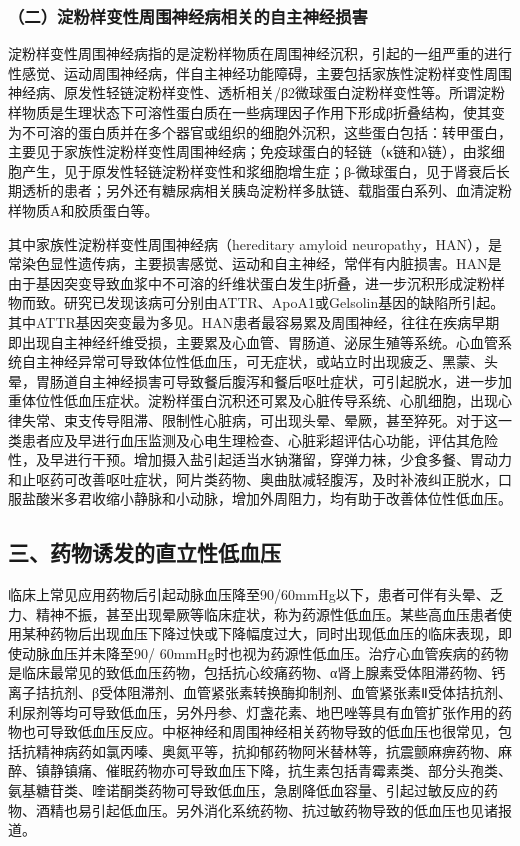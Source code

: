 \subsubsection{（二）淀粉样变性周围神经病相关的自主神经损害}

淀粉样变性周围神经病指的是淀粉样物质在周围神经沉积，引起的一组严重的进行性感觉、运动周围神经病，伴自主神经功能障碍，主要包括家族性淀粉样变性周围神经病、原发性轻链淀粉样变性、透析相关/β2微球蛋白淀粉样变性等。所谓淀粉样物质是生理状态下可溶性蛋白质在一些病理因子作用下形成β折叠结构，使其变为不可溶的蛋白质并在多个器官或组织的细胞外沉积，这些蛋白包括：转甲蛋白，主要见于家族性淀粉样变性周围神经病；免疫球蛋白的轻链（κ链和λ链），由浆细胞产生，见于原发性轻链淀粉样变性和浆细胞增生症；β-微球蛋白，见于肾衰后长期透析的患者；另外还有糖尿病相关胰岛淀粉样多肽链、载脂蛋白系列、血清淀粉样物质A和胶质蛋白等。

其中家族性淀粉样变性周围神经病（hereditary amyloid
neuropathy，HAN），是常染色显性遗传病，主要损害感觉、运动和自主神经，常伴有内脏损害。HAN是由于基因突变导致血浆中不可溶的纤维状蛋白发生β折叠，进一步沉积形成淀粉样物而致。研究已发现该病可分别由ATTR、ApoA1或Gelsolin基因的缺陷所引起。其中ATTR基因突变最为多见。HAN患者最容易累及周围神经，往往在疾病早期即出现自主神经纤维受损，主要累及心血管、胃肠道、泌尿生殖等系统。心血管系统自主神经异常可导致体位性低血压，可无症状，或站立时出现疲乏、黑蒙、头晕，胃肠道自主神经损害可导致餐后腹泻和餐后呕吐症状，可引起脱水，进一步加重体位性低血压症状。淀粉样蛋白沉积还可累及心脏传导系统、心肌细胞，出现心律失常、束支传导阻滞、限制性心脏病，可出现头晕、晕厥，甚至猝死。对于这一类患者应及早进行血压监测及心电生理检查、心脏彩超评估心功能，评估其危险性，及早进行干预。增加摄入盐引起适当水钠潴留，穿弹力袜，少食多餐、胃动力和止呕药可改善呕吐症状，阿片类药物、奥曲肽减轻腹泻，及时补液纠正脱水，口服盐酸米多君收缩小静脉和小动脉，增加外周阻力，均有助于改善体位性低血压。

\subsection{三、药物诱发的直立性低血压}

临床上常见应用药物后引起动脉血压降至90/60mmHg以下，患者可伴有头晕、乏力、精神不振，甚至出现晕厥等临床症状，称为药源性低血压。某些高血压患者使用某种药物后出现血压下降过快或下降幅度过大，同时出现低血压的临床表现，即使动脉血压并未降至90/
60mmHg时也视为药源性低血压。治疗心血管疾病的药物是临床最常见的致低血压药物，包括抗心绞痛药物、α肾上腺素受体阻滞药物、钙离子拮抗剂、β受体阻滞剂、血管紧张素转换酶抑制剂、血管紧张素Ⅱ受体拮抗剂、利尿剂等均可导致低血压，另外丹参、灯盏花素、地巴唑等具有血管扩张作用的药物也可导致低血压反应。中枢神经和周围神经相关药物导致的低血压也很常见，包括抗精神病药如氯丙嗪、奥氮平等，抗抑郁药物阿米替林等，抗震颤麻痹药物、麻醉、镇静镇痛、催眠药物亦可导致血压下降，抗生素包括青霉素类、部分头孢类、氨基糖苷类、喹诺酮类药物可导致低血压，急剧降低血容量、引起过敏反应的药物、酒精也易引起低血压。另外消化系统药物、抗过敏药物导致的低血压也见诸报道。

